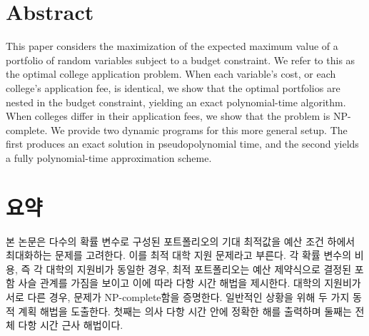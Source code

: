 \documentclass[12pt]{article} %
\author{Max Kapur}
\date{\today}                %
\theoremstyle{definition}
\theoremstyle{definition}
\begin{document}
\maketitle

\section*{Abstract}
This paper considers the maximization of the expected maximum value of a portfolio of random variables subject to a budget constraint. We refer to this as the optimal college application problem. When each variable's cost, or each college's application fee, is identical, we show that the optimal portfolios are nested in the budget constraint, yielding an exact polynomial-time algorithm. When colleges differ in their application fees, we show that the problem is NP-complete. We provide two dynamic programs for this more general setup. The first produces an exact solution in pseudopolynomial time, and the second yields a fully polynomial-time approximation scheme. 

\section*{요약}
본 논문은 다수의 확률 변수로 구성된 포트폴리오의 기대 최적값을 예산 조건 하에서 최대화하는 문제를 고려한다. 이를 최적 대학 지원 문제라고 부른다. 각 확률 변수의 비용, 즉 각 대학의 지원비가 동일한 경우, 최적 포트폴리오는 예산 제약식으로 결정된 포함 사슬 관계를 가짐을 보이고 이에 따라 다항 시간 해법을 제시한다. 대학의 지원비가 서로 다른 경우, 문제가 NP-complete함을 증명한다. 일반적인 상황을 위해 두 가지 동적 계획 해법을 도출한다. 첫째는 의사 다항 시간 안에 정확한 해를 출력하며 둘째는 전체 다항 시간 근사 해법이다.

\pagebreak

\tableofcontents
\end{document}

